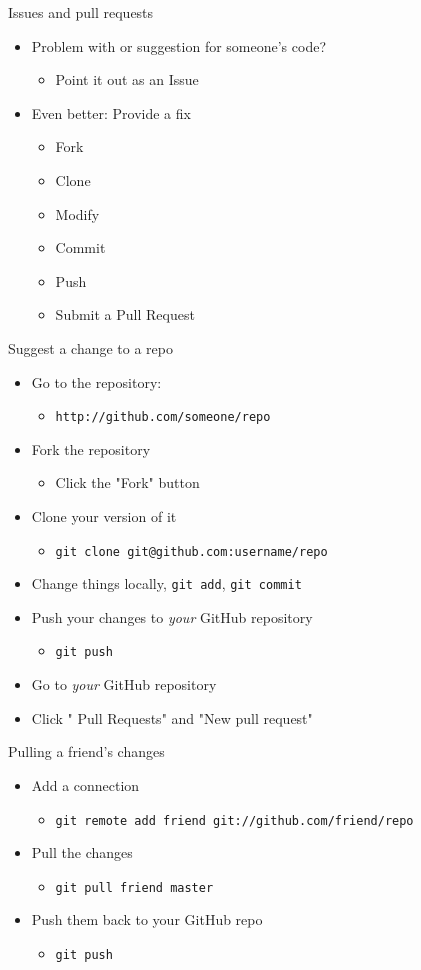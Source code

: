 \documentclass[12pt,t]{beamer}
\newcommand{\bi}{\begin{itemize}}
\newcommand{\bbi}{\vspace{24pt} \begin{itemize} \itemsep8pt}
\newcommand{\ei}{\end{itemize}}
\begin{document}
\begin{frame}{Issues and pull requests}
\bbi
\item Problem with or suggestion for someone's code?
\bi
\item Point it out as an Issue
\ei
\item Even better: Provide a fix
\bi
\item Fork
\item Clone
\item Modify
\item Commit
\item Push
\item Submit a Pull Request
\ei
\ei

\note{
}
\end{frame}


\begin{frame}[fragile]{Suggest a change to a repo}
\bbi
\item Go to the repository:
\bi
\item[] \verb|http://github.com/someone/repo|
\ei
\item {\color{hilit} Fork} the repository
\bi
\item[] Click the "Fork" button
\ei
\item {\color{hilit} Clone} your version of it
\bi
\item[] {\tt git clone git@github.com:username/repo}
\ei
\item Change things locally, {\tt git \color{hilit} add}, {\tt git \color{hilit} commit}
\item Push your changes to \emph{your\/} GitHub repository
\bi
\item[] {\tt git \color{hilit} push}
\ei
\item Go to \emph{your\/} GitHub repository
\item Click "{\color{hilit} Pull Requests}" and "New pull request"
\ei

\note{
}
\end{frame}


\begin{frame}[fragile]{Pulling a friend's changes}
\bbi
\item Add a connection
\bi
\item[] {\tt git remote add friend git://github.com/friend/repo}
\ei
\item Pull the changes
\bi
\item[] {\tt git pull friend master}
\ei
\item Push them back to your GitHub repo
\bi
\item[] {\tt git push}
\ei
\ei

\note{
}
\end{frame}
\end{document}
